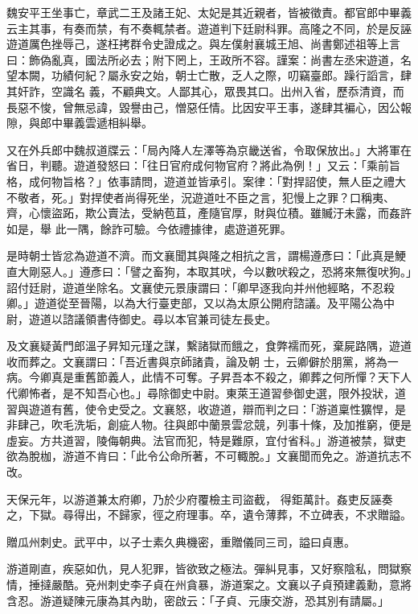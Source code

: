 \begin{pinyinscope}
 魏安平王坐事亡，章武二王及諸王妃、太妃是其近親者，皆被徵責。都官郎中畢義云主其事，有奏而禁，有不奏輒禁者。遊道判下廷尉科罪。高隆之不同，於是反誣遊道厲色挫辱己，遂枉拷群令史證成之。與左僕射襄城王旭、尚書鄭述祖等上言曰：飾偽亂真，國法所必去；附下罔上，王政所不容。謹案：尚書左丞宋遊道，名望本闕，功績何紀？屬永安之始，朝士亡散，乏人之際，叨竊臺郎。躁行謟言，肆其奸詐，空識名
 義，不顧典文。人鄙其心，眾畏其口。出州入省，歷忝清資，而長惡不悛，曾無忌諱，毀譽由己，憎惡任情。比因安平王事，遂肆其褊心，因公報隙，與郎中畢義雲遞相糾舉。



 又在外兵郎中魏叔道牒云：「局內降人左澤等為京畿送省，令取保放出。」大將軍在省日，判聽。遊道發怒曰：「往日官府成何物官府？將此為例！」又云：「乘前旨格，成何物旨格？」依事請問，遊道並皆承引。案律：「對捍詔使，無人臣之禮大不敬者，死。」對捍使者尚得死坐，況遊道吐不臣之言，犯慢上之罪？口稱夷、齊，心懷盜跖，欺公賣法，受納苞苴，產隨官厚，財與位積。雖贓汙未露，而姦許如是，舉
 此一隅，餘詐可驗。今依禮據律，處遊道死罪。



 是時朝士皆忿為遊道不濟。而文襄聞其與隆之相抗之言，謂楊遵彥曰：「此真是鯁直大剛惡人。」遵彥曰：「譬之畜狗，本取其吠，今以數吠殺之，恐將來無復吠狗。」詔付廷尉，遊道坐除名。文襄使元景康謂曰：「卿早逐我向并州他經略，不忍殺卿。」遊道從至晉陽，以為大行臺吏部，又以為太原公開府諮議。及平陽公為中尉，遊道以諮議領書侍御史。尋以本官兼司徒左長史。



 及文襄疑黃門郎溫子昇知元瑾之謀，繫諸獄而餓之，食弊襦而死，棄屍路隅，遊道收而葬之。文襄謂曰：「吾近書與京師諸貴，論及朝
 士，云卿僻於朋黨，將為一病。今卿真是重舊節義人，此情不可奪。子昇吾本不殺之，卿葬之何所憚？天下人代卿怖者，是不知吾心也。」尋除御史中尉。東萊王道習參御史選，限外投狀，道習與遊道有舊，使令史受之。文襄怒，收遊道，辯而判之曰：「游道稟性獷悍，是非肆己，吹毛洗垢，創疵人物。往與郎中蘭景雲忿競，列事十條，及加推窮，便是虛妄。方共道習，陵侮朝典。法官而犯，特是難原，宜付省科。」游道被禁，獄吏欲為脫枷，游道不肯曰：「此令公命所著，不可輙脫。」文襄聞而免之。游道抗志不改。



 天保元年，以游道兼太府卿，乃於少府覆檢主司盜截，
 得鉅萬計。姦吏反誣奏之，下獄。尋得出，不歸家，徑之府理事。卒，遺令薄葬，不立碑表，不求贈謚。



 贈瓜州刺史。武平中，以子士素久典機密，重贈儀同三司，謚曰貞惠。



 游道剛直，疾惡如仇，見人犯罪，皆欲致之極法。彈糾見事，又好察陰私，問獄察情，捶撻嚴酷。兗州刺史李子貞在州貪暴，游道案之。文襄以子貞預建義勳，意將含忍。游道疑陳元康為其內助，密啟云：「子貞、元康交游，恐其別有請屬。」




\end{pinyinscope}
